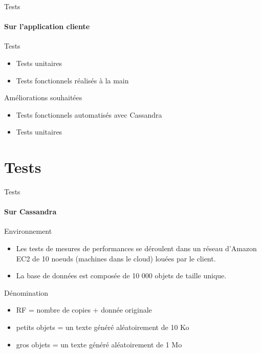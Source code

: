 \documentclass{beamer}
\begin{document}
\begin{frame}{Tests}
 \framesubtitle{Sur l'application cliente}
 \begin{block}{Tests }
	\begin{itemize}
	\item Tests unitaires
	\item Tests fonctionnels réalisés à la main
	\end{itemize}
 \end{block}
  
 \begin{block}{Améliorations souhaitées}
 	\begin{itemize}
 		\item Tests fonctionnels automatisés avec Cassandra
 		\item Tests unitaires 
 	\end{itemize}
 \end{block}
 
\end{frame}

\section{Tests}

\begin{frame}{Tests}
\framesubtitle{Sur Cassandra}
\begin{block}{Environnement}
    \begin{itemize}
        \item Les tests de mesures de performances se déroulent dans un réseau d'Amazon EC2 de 10 noeuds (machines dans le cloud) louées par le client.
        \item La base de données est composée de 10 000 objets de taille unique.
    \end{itemize}
\end{block}
\begin{block}{Dénomination}
    \begin{itemize}
        \item RF = nombre de copies + donnée originale
        \item petits objets = un texte généré aléatoirement de 10 Ko
        \item gros objets = un texte généré aléatoirement de 1 Mo
    \end{itemize}
\end{block}
\end{frame}
\end{document}
